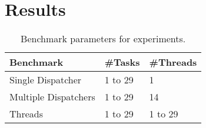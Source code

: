 \section{Results}
\label{sec:results}


	\begin{table}[b]
	\centering
	\caption{Benchmark parameters for experiments.}
	\label{tab:benchmarks-parameters}
	\begin{tabular}{lll}
	\toprule
			\textbf{Benchmark}   & \textbf{\#Tasks} & \textbf{\#Threads} \\
			\midrule
			Single Dispatcher    & 1 to 29          & 1                  \\
			Multiple Dispatchers & 1 to 29          & 14                 \\
			Threads              & 1 to 29          & 1 to 29            \\
			\bottomrule
	\end{tabular}
	\end{table}

